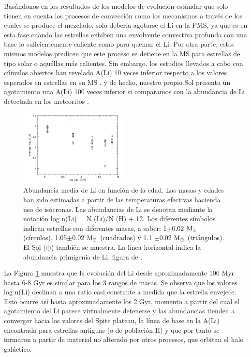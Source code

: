 Basándonos en los resultados de los modelos de evolución estándar que solo tienen en cuenta los procesos de convección como los mecanismos a través de los cuales se produce el mezclado, solo debería agotarse el Li en la PMS, ya que es en esta fase cuando las estrellas exhiben una envolvente convectiva profunda con una base lo suficientemente caliente como para quemar el Li. Por otra parte, estos mismos modelos predicen que este proceso se detiene en la MS para estrellas de tipo solar o aquéllas más calientes. Sin embargo, los estudios llevados a cabo con cúmulos abiertos han revelado A(Li) 10 veces inferior respecto a los valores esperados en estrellas en su MS \cite{Sestito2005}, y de hecho, nuestro propio Sol presenta un agotamiento una A(Li) 100 veces inferior si comparamos con la abundancia de Li detectada en los meteoritos \cite{Lodders2003}.\par

\begin{figure}
	\centering
	\includegraphics[width=0.5\textwidth]{img/tesis/li_abundances_vs_age.pdf}
	\caption{Abundancia media de Li en función de la edad. Las masas y edades han sido estimadas a partir de las temperaturas efectivas hacienda uso de isócronas. Las abundancias de Li se denotan mediante la notación log n(Li) = N (Li)/N (H) + 12. Los diferentes símbolos indican estrellas con diferentes masas, a saber: 1$\pm$0.02 $\mathrm{M}_\odot$ (círculos), 1.05$\pm$0.02 $\mathrm{M}_\odot$ (cuadrados) y 1.1 $\pm$0.02 $\mathrm{M}_\odot$ (triángulos). El Sol ($\odot$) también se muestra. La línea horizontal indica la abundancia primigenia de Li, figura de \cite{Randich2006}.}
	\label{fig:li_abundances_vs_age}
\end{figure}

La Figura \ref{fig:li_abundances_vs_age} muestra que la evolución del Li desde aproximadamente 100 Myr hasta 6-8 Gyr es similar para los 3 rangos de masas. Se observa que los valores log n(Li) declinan a una ratio casi constante a medida que la estrella envejece. Esto ocurre así hasta aproximadamente los 2 Gyr, momento a partir del cual el agotamiento del Li parece virtualmente detenerse y las abundancias tienden a converger hacia los valores del Spite plateau, la línea de base en la A(Li) encontrada para estrellas antiguas (o de población II) y que por tanto se formaron a partir de material no alterado por otros procesos, que orbitan el halo galáctico. \par


